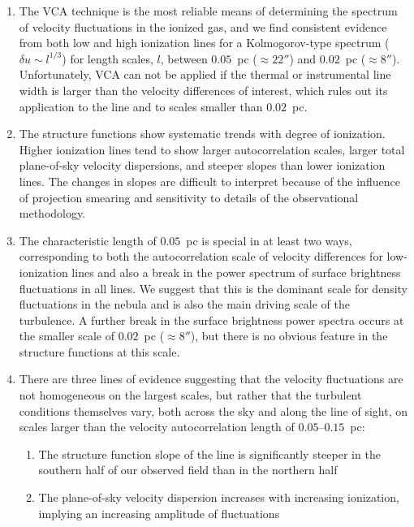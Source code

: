 \documentclass[useAMS,usenatbib]{mn2e}
\begin{document}
\begin{enumerate}
\item The VCA technique is the most reliable means of determining the
  spectrum of velocity fluctuations in the ionized gas, and we find
  consistent evidence from both low and high ionization lines for a
  Kolmogorov-type spectrum (\(\delta u \sim l^{1/3}\)) for length
  scales, \(l\), between \(0.05\)~pc (\(\approx 22''\)) and \(0.02\)~pc
  (\(\approx 8''\)).  Unfortunately, VCA can not be applied if the
  thermal or instrumental line width is larger than the velocity
  differences of interest, which rules out its application to the
  \ha{} line and to scales smaller than \(0.02\)~pc. 
\item The structure functions show systematic trends with degree of
  ionization.  Higher ionization lines tend to show larger
  autocorrelation scales, larger total plane-of-sky velocity
  dispersions, and steeper slopes than lower ionization lines.  The
  changes in slopes are difficult to interpret because of the
  influence of projection smearing and sensitivity to details of the
  observational methodology.
\item The characteristic length of \(0.05\)~pc is special in at least
  two ways, corresponding to both the autocorrelation scale of
  velocity differences for low-ionization lines and also a break in
  the power spectrum of surface brightness fluctuations in all lines.
  We suggest that this is the dominant scale for density fluctuations
  in the nebula and is also the main driving scale of the
  turbulence. A further break in the surface brightness power spectra
  occurs at the smaller scale of \(0.02\)~pc (\(\approx 8''\)), but
  there is no obvious feature in the structure functions at this
  scale.
\item There are three lines of evidence suggesting that the velocity
  fluctuations are not homogeneous on the largest scales, but rather
  that the turbulent conditions themselves vary, both across the sky and
  along the line of sight, on scales larger than the velocity
  autocorrelation length of \(0.05\)--\(0.15\)~pc:
  \begin{enumerate}
  \item The structure function slope of the \nii{} line is
    significantly steeper in the southern half of our observed field
    than in the northern half
  \item The plane-of-sky velocity dispersion increases with increasing
    ionization, implying an increasing amplitude of fluctuations

\end{enumerate}
\end{enumerate}
\end{document}
